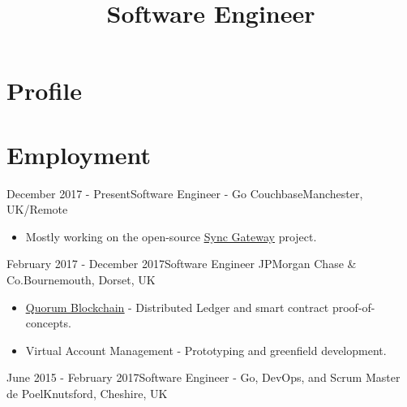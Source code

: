 \documentclass[11pt,a4paper]{moderncv}
\title{Software Engineer}
\newcommand\styledhref[2]{\uline{\href{#1}{#2}}}
\begin{document}
	\maketitle

	\vspace{-3.5em}

	\section{Profile}

	\section{Employment}
		\cventry
			{December 2017 - Present}{Software Engineer - Go}
			{Couchbase}{Manchester, UK/Remote}{}{
				\vspace{.25em}
					\begin{itemize}
					\item Mostly working on the open-source \styledhref{https://github.com/couchbase/sync_gateway}{Sync Gateway} project.
					\end{itemize}
				\vspace{.1em}
				\vspace{.25em}
			}
		\cventry
			{February 2017 - December 2017}{Software Engineer}
			{JPMorgan Chase \& Co.}{Bournemouth, Dorset, UK}{}{
				\vspace{.25em}
				\begin{itemize}
					\item \styledhref{https://github.com/jpmorganchase/quorum}{Quorum Blockchain} - Distributed Ledger and smart contract proof-of-concepts.
					\item Virtual Account Management - Prototyping and greenfield development.
				\end{itemize}
				\vspace{.25em}
			}
		\cventry
			{June 2015 - February 2017}{Software Engineer - Go, DevOps, and Scrum Master}
			{de Poel}{Knutsford, Cheshire, UK}
\end{document}
